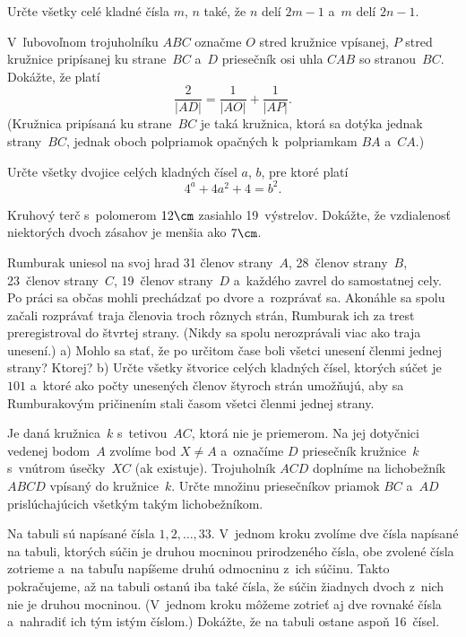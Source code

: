 {%
Určte všetky celé kladné čísla $m$, $n$ také, že $n$ delí $2m-1$
a~$m$ delí $2n-1$.}

{%
V~ľubovoľnom trojuholníku $ABC$ označme $O$ stred kružnice vpísanej, $P$
stred kružnice pripísanej ku strane~$BC$ a~$D$ priesečník osi uhla
$CAB$ so stranou~$BC$. Dokážte, že platí
$$
\frac{2}{|AD|}=\frac{1}{|AO|}+\frac{1}{|AP|}.
$$
(Kružnica pripísaná ku strane~$BC$ je taká kružnica, ktorá sa dotýka jednak strany~$BC$,
jednak oboch polpriamok opačných k~polpriamkam $BA$ a~$CA$.)}

{%
Určte všetky dvojice celých kladných čísel $a$, $b$, pre ktoré platí
$$
4^a+4a^2+4=b^2.
$$
}

{%
Kruhový terč s~polomerom $12\cm$ zasiahlo 19~výstrelov. Dokážte, že
vzdialenosť niektorých dvoch zásahov je menšia ako $7\cm$.}

{%
Rumburak uniesol na svoj hrad 31 členov strany~$A$, 28~členov strany~$B$,
23~členov strany~$C$, 19~členov strany~$D$ a~každého zavrel do
samostatnej cely. Po práci sa občas mohli prechádzať po dvore a~rozprávať sa.
Akonáhle sa spolu začali rozprávať traja členovia troch rôznych strán, Rumburak
ich za trest preregistroval do štvrtej strany. (Nikdy sa
spolu nerozprávali viac ako traja unesení.)
\ite a) Mohlo sa stať, že po určitom čase boli všetci unesení
členmi jednej strany? Ktorej?
\ite b) Určte všetky štvorice celých kladných čísel,
ktorých súčet je~$101$
a~ktoré ako počty unesených členov štyroch strán umožňujú, aby
sa Rumburakovým pričinením stali časom všetci členmi jednej strany.}

{%
Je daná kružnica~$k$ s~tetivou~$AC$, ktorá nie je priemerom.
Na jej dotyčnici vedenej bodom~$A$ zvolíme bod $X\ne A$
a~označíme $D$ priesečník kružnice~$k$ s~vnútrom úsečky~$XC$
(ak existuje). Trojuholník $ACD$ doplníme na lichobežník
$ABCD$ vpísaný do kružnice~$k$. Určte množinu priesečníkov priamok $BC$
a~$AD$ prislúchajúcich všetkým takým lichobežníkom.}

{%
Na tabuli sú napísané čísla $1,2,\dots,33$. V~jednom kroku zvolíme
dve čísla napísané na tabuli, ktorých súčin je druhou
mocninou prirodzeného čísla, obe zvolené čísla zotrieme
a~na tabuľu napíšeme druhú odmocninu z~ich súčinu. Takto pokračujeme,
až na tabuli ostanú iba také čísla, že súčin žiadnych dvoch z~nich
nie je druhou mocninou. (V~jednom kroku môžeme zotrieť aj dve
rovnaké čísla a~nahradiť ich tým istým číslom.)
Dokážte, že na tabuli ostane aspoň 16~čísel.}

